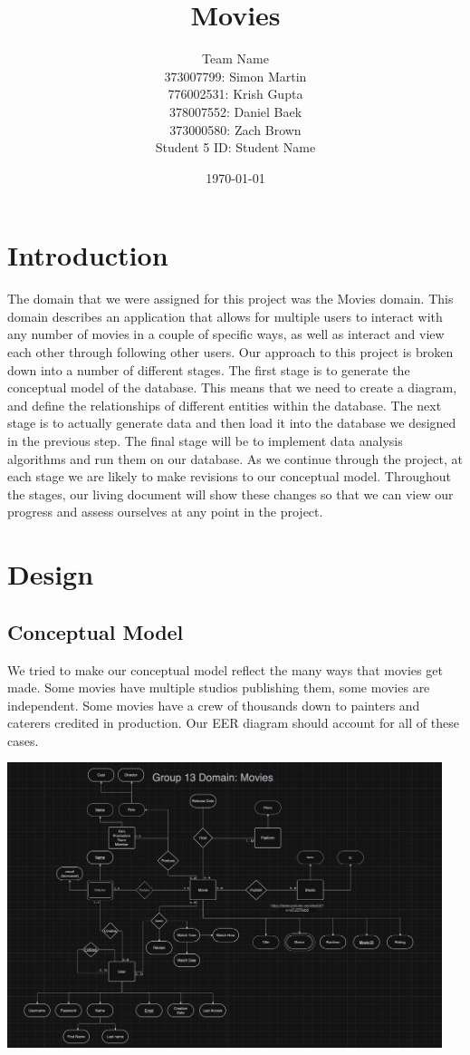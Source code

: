 \documentclass[12pt]{article}
\title{Movies}
\date{\today}
\author{Team Name \\
        373007799: Simon Martin\\
        776002531: Krish Gupta\\
        378007552: Daniel Baek\\
        373000580: Zach Brown\\
        Student 5 ID: Student Name\\
        }
\begin{document}
\maketitle

\section{Introduction}
The domain that we were assigned for this project was the Movies domain. This domain describes an application that allows for multiple users to interact with any number of movies in a couple of specific ways, as well as interact and view each other through following other users. Our approach to this project is broken down into a number of different stages.
The first stage is to generate the conceptual model of the database. This means that we need to create a diagram, and define the relationships of different entities within the database. The next stage is to actually generate data and then load it into the database we designed in the previous step. The final stage will be to implement data analysis algorithms and run them on our database.
As we continue through the project, at each stage we are likely to make revisions to our conceptual model. Throughout the stages, our living document will show these changes so that we can view our progress and assess ourselves at any point in the project.

\section{Design}
\subsection{Conceptual Model}
We tried to make our conceptual model reflect the many ways that movies get made. Some movies have multiple studios publishing them, some movies are independent. Some movies have a crew of thousands down to painters and caterers credited in production. Our EER diagram should account for all of these cases.

\includegraphics[width=5in]{images/temp_eer.png}
\end{document}
